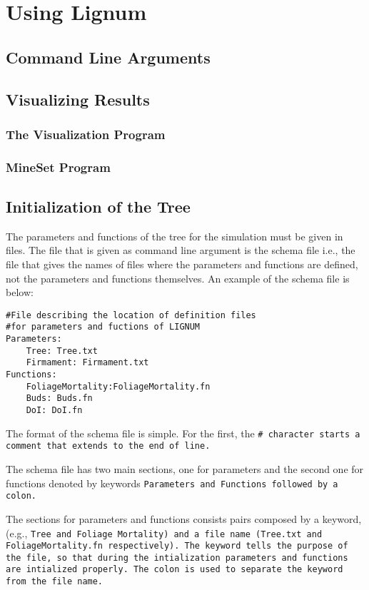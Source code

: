 \chapter{Using Lignum}
\section{Command Line Arguments}
\section{Visualizing Results}
\subsection{The Visualization Program}
\subsection{MineSet Program}

\section{Initialization of the Tree}

The parameters and functions of the tree for the simulation 
must be given in files. The file that is given as command 
line argument is the schema file i.e., the file that gives the 
names of files where the parameters and functions are defined, 
not the parameters and functions themselves. An example of the schema file
is below:

\begin{verbatim}
#File describing the location of definition files
#for parameters and fuctions of LIGNUM
Parameters:
    Tree: Tree.txt 
    Firmament: Firmament.txt
Functions:
    FoliageMortality:FoliageMortality.fn
    Buds: Buds.fn
    DoI: DoI.fn
\end{verbatim}

The format of the schema file is simple. For the first, the \tt \# \rm
character starts a comment that extends to the end of line.  

The schema file has two main sections, one for parameters and
the second one for functions denoted by keywords 
\tt Parameters \rm and \tt Functions \rm followed by a colon.
 
The sections for parameters and functions consists pairs
composed by a keyword,(e.g., \tt Tree \rm and 
\tt Foliage Mortality\rm) and a file name
(\tt Tree.txt \rm and \tt FoliageMortality.fn \rm respectively). 
The keyword tells the purpose of the file, so that
during the intialization parameters and functions are
intialized properly. The colon is used to separate the
keyword from the file name.

